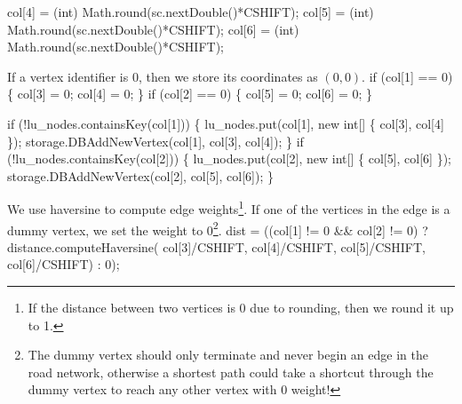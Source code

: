 \documentclass{article}
\def\nwendcode{\endtrivlist \endgroup}      %
\let\nwdocspar=\par
\begin{document}
col[4] = (int) Math.round(sc.nextDouble()*CSHIFT);
col[5] = (int) Math.round(sc.nextDouble()*CSHIFT);
col[6] = (int) Math.round(sc.nextDouble()*CSHIFT);
\nwendcode{}\nwdocspar
If a vertex identifier is $0$, then we store its coordinates as $(0,0)$.
\nwenddocs{}\endmoddef{}
if (col[1] == 0) \{
  col[3] = 0;
  col[4] = 0;
\}
if (col[2] == 0) \{
  col[5] = 0;
  col[6] = 0;
\}
\nwendcode{}\nwdocspar
\nwenddocs{}\endmoddef{}
if (!lu_nodes.containsKey(col[1])) \{
  lu_nodes.put(col[1], new int[] \{ col[3], col[4] \});
  storage.DBAddNewVertex(col[1], col[3], col[4]);
\}
if (!lu_nodes.containsKey(col[2])) \{
  lu_nodes.put(col[2], new int[] \{ col[5], col[6] \});
  storage.DBAddNewVertex(col[2], col[5], col[6]);
\}
\nwendcode{}\nwdocspar
We use haversine to compute edge weights\footnote{If the distance between two
vertices is 0 due to rounding, then we round it up to 1.}.  If one of the
vertices in the edge is a dummy vertex, we set the weight to 0\footnote{The
dummy vertex should only terminate and never begin an edge in the road network,
otherwise a shortest path could take a shortcut through the dummy vertex to
reach any other vertex with 0 weight!}.
\nwenddocs{}\endmoddef{}
dist = ((col[1] != 0 && col[2] != 0)
  ? distance.computeHaversine(
        col[3]/CSHIFT, col[4]/CSHIFT,
        col[5]/CSHIFT, col[6]/CSHIFT) : 0);
\nwendcode{}\nwdocspar
\end{document}
